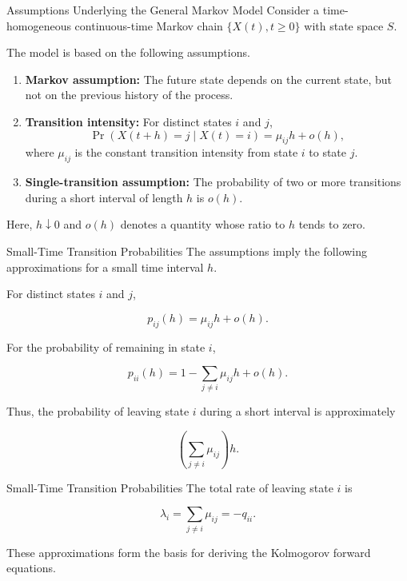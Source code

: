 \documentclass[
  ignorenonframetext,
  aspectratio=169,
]{beamer}
\begin{document}
\begin{frame}{Assumptions Underlying the General Markov Model}
\protect{}\label{assumptions-underlying-the-general-markov-model}
Consider a time-homogeneous continuous-time Markov chain
\(\{X(t),t\geq 0\}\) with state space \(S\).

The model is based on the following assumptions.

\begin{enumerate}
\item
  \textbf{Markov assumption:} The future state depends on the current
  state, but not on the previous history of the process.
\item
  \textbf{Transition intensity:} For distinct states \(i\) and \(j\), \[
  \Pr(X(t+h)=j\mid X(t)=i)
  =\mu_{ij}h+o(h),
  \] where \(\mu_{ij}\) is the constant transition intensity from state
  \(i\) to state \(j\).
\item
  \textbf{Single-transition assumption:} The probability of two or more
  transitions during a short interval of length \(h\) is \(o(h)\).
\end{enumerate}

Here, \(h\downarrow 0\) and \(o(h)\) denotes a quantity whose ratio to
\(h\) tends to zero.
\end{frame}

\begin{frame}{Small-Time Transition Probabilities}
\protect{}\label{small-time-transition-probabilities}
The assumptions imply the following approximations for a small time
interval \(h\).

For distinct states \(i\) and \(j\),

\[
p_{ij}(h)=\mu_{ij}h+o(h).
\]

For the probability of remaining in state \(i\),

\[
p_{ii}(h)
=1-\sum_{j\neq i}\mu_{ij}h+o(h).
\]

Thus, the probability of leaving state \(i\) during a short interval is
approximately

\[
\left(\sum_{j\neq i}\mu_{ij}\right)h.
\]
\end{frame}

\begin{frame}{Small-Time Transition Probabilities}
\protect{}\label{small-time-transition-probabilities-1}
The total rate of leaving state \(i\) is

\[
\lambda_i=\sum_{j\neq i}\mu_{ij}=-q_{ii}.
\]

These approximations form the basis for deriving the Kolmogorov forward
equations.
\end{frame}
\end{document}
